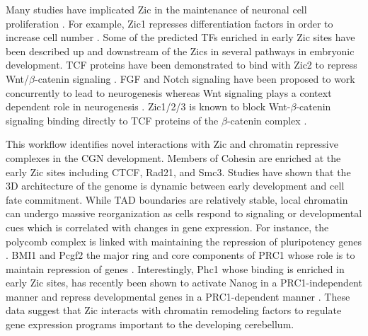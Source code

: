 \documentclass[fleqn,10pt]{wlscirep}
\begin{document}
Many studies have implicated Zic in the maintenance of neuronal cell proliferation \cite{ Lim2007Zic3Cells, Janesick2013ERFNeurogenesis, Aruga2002Zic1Differentiation, Ebert2003Zic1Autoregulation }. For example, Zic1 represses differentiation factors in order to increase cell number \cite{Aruga2002Zic1Differentiation}. Some of the predicted TFs enriched in early Zic sites have been described up and downstream of the Zics in several pathways in embryonic development. TCF proteins have been demonstrated to bind with Zic2 to repress  Wnt/$\beta$-catenin signaling \cite{Aruga2018Zic1, Lowenstein2021Olig3Development}. FGF and Notch signaling have been proposed to work concurrently to lead to neurogenesis \cite{Voelkel2014FGFHierarchy} whereas Wnt signaling plays a context dependent role in neurogenesis \cite{Lassiter2014SignalingDelamination}. Zic1/2/3 is known to block Wnt-$\beta$-catenin signaling binding directly to TCF proteins of the $\beta$-catenin complex \cite{Ge2020Zic1Transition, Fujimi2012XenopusPathway, Murgan2015AtypicalPrecursors, Pourebrahim2011TranscriptionSignaling, Aruga2018ZicDisease,Aruga2018Zic1,Lowenstein2021Olig3Development}.  



This workflow identifies novel interactions with Zic and chromatin repressive complexes in the CGN development. Members of Cohesin are enriched at the early Zic sites including CTCF, Rad21, and Smc3. Studies have shown that the 3D architecture of the genome is dynamic between early development and cell fate commitment. While TAD boundaries are relatively stable, local chromatin can undergo massive reorganization as cells respond to signaling or developmental cues which is correlated with changes in gene expression\cite{Zheng2019TheDifferentiation, Bonev2016OrganizationGenome}. For instance, the polycomb complex is linked with maintaining the repression of pluripotency genes \cite{Riising2014GeneWide}. BMI1 and Pcgf2 the major ring  and core components of PRC1 whose role is to maintain repression of genes \cite{Aranda2015RegulationProteins}. Interestingly, Phc1 whose binding is enriched in early Zic sites, has recently been shown to activate  Nanog in a PRC1-independent manner and repress developmental genes in a PRC1-dependent manner \cite{Chen2021Phc1Locus}. These data suggest that Zic interacts with chromatin remodeling factors to regulate gene expression programs important to the developing cerebellum. 
\end{document}

